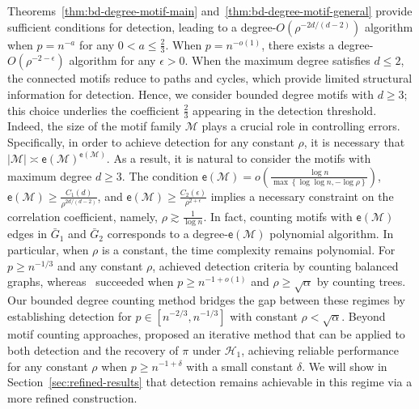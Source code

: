 \documentclass[letterpaper,11pt]{article}
\theoremstyle{definition}
\newcommand{\maH}{\mathcal{H}}
\newcommand{\maM}{\mathcal{M}}
\newcommand{\nbr}[1]{{\sf\color{red}[#1]}}
\newcommand{\en}{\mathsf{{e}}}
\newcommand{\pth}[1]{\left( #1 \right)}
\newcommand{\sth}[1]{\left\{ #1 \right\}}
\begin{document}
Theorems~\ref{thm:bd-degree-motif-main} and~\ref{thm:bd-degree-motif-general} provide sufficient conditions for detection, leading to a  degree-$O(\rho^{-2d/(d-2)})$ algorithm  when $p = n^{-a}$ for any $0<a\le \tfrac{2}{3}$. When $p=n^{-o(1)}$, there exists a degree-$O(\rho^{-2-\epsilon})$ algorithm for any $\epsilon>0$.
When the maximum degree satisfies $d \le 2$, the  connected motifs reduce to paths and cycles, which provide limited structural information for detection. Hence, we consider bounded degree motifs with $d \ge 3$; this choice underlies the coefficient $\tfrac{2}{3}$ appearing in the detection threshold.
Indeed, the size of the motif family $\maM$ plays a crucial role in controlling errors. Specifically, in order to achieve detection for any constant $\rho$, it is necessary that $|\maM|\asymp \en(\maM)^{\en(\maM)}$. As a result, it is natural to consider the motifs with maximum degree $d\ge 3$. 
The condition  $\en(\maM) = o(\frac{\log n}{\max\sth{\log \log n,-\log \rho}})$, $\en(\maM)\ge \frac{C_1\pth{d}}{\rho^{ {2d/(d-2)}}}$, and $\en(\maM)\ge \frac{C_2(\epsilon)}{\rho^{2+\epsilon}}$ implies a necessary constraint on the correlation coefficient, namely, $\rho \gtrsim \frac{1}{\log n}$. In fact, counting motifs with $\en(\maM)$ edges in $\bar{G}_1$ and $\bar{G}_2$ corresponds to a degree-$\en(\maM)$ polynomial algorithm.
In particular, when $\rho$ is a constant, the time complexity remains polynomial. 
For  $p\ge n^{-1/3}$ and any constant $\rho$, \cite{barak2019nearly}
achieved detection criteria by counting balanced graphs, whereas~\cite{mao2024testing} succeeded when $p\ge n^{-1+o(1)}$ and $\rho \ge \sqrt{\alpha}$ by counting trees.
Our bounded degree counting method bridges the gap between these regimes by establishing detection for $p\in [n^{-2/3},n^{-1/3}]$ with constant $\rho <\sqrt{\alpha}$.
Beyond motif counting approaches, \cite{ding2023polynomial} proposed an iterative method that can be applied to both detection and the recovery of $\pi$ under $\maH_1$, achieving reliable performance for any constant $\rho$ when $p \ge n^{-1+\delta}$ with a small constant $\delta$. We will show in Section~\ref{sec:refined-results} that detection remains achievable in this regime via a more refined construction.

\end{document}
